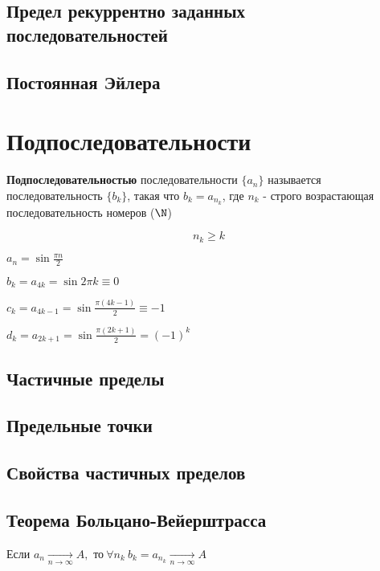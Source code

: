 \subsection{Предел рекуррентно заданных последовательностей}
\subsection{Постоянная Эйлера}

\section{Подпоследовательности}

\begin{definition}
    \textbf{Подпоследовательностью} последовательности $\{a_n\}$ называется последовательность $\{b_k\}$, такая что $b_k = a_{n_k}$, где $n_k$ - строго возрастающая последовательность номеров ($\N$)
\end{definition}

\begin{remark}[Замечание]
    $$ n_k \geq k $$
\end{remark}

\begin{example}
    $ a_n = \sin \frac{\pi n}{2} $

    $ b_k = a_{4k} = \sin 2\pi k \equiv 0$

    $ c_k = a_{4k - 1} = \sin \frac{\pi (4k - 1)}{2} \equiv -1$

    $ d_k = a_{2k + 1} = \sin \frac{\pi (2k + 1)}{2} = (-1)^k  $
\end{example}

\subsection{Частичные пределы}
\subsection{Предельные точки} 
\subsection{Свойства частичных пределов}
\newpage
\subsection{Теорема Больцано-Вейерштрасса}

\begin{theorem}
Если $a_n \underset{n \to \infty}{\to} A, \text{ то}\ \forall n_k\ b_k = a_{n_k} \underset{n \to \infty}{\to} A $ 
\end{theorem}


